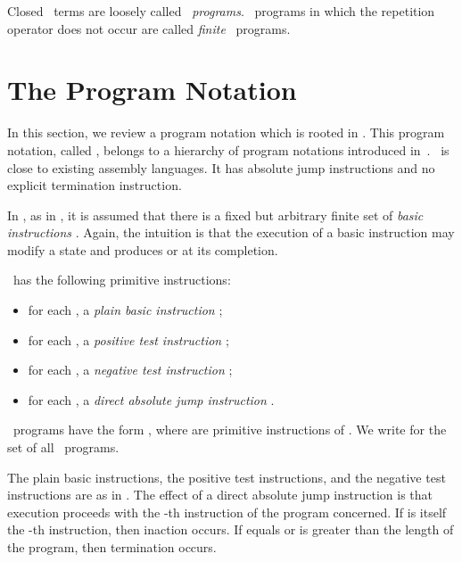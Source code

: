 \documentclass[fleqn]{llncs}
\begin{document}
Closed \PGA\ terms are loosely called \PGA\ \emph{programs}.
\PGA\ programs in which the repetition operator does not occur are
called \emph{finite} \PGA\ programs.

\section{The Program Notation \PGLD}
\label{sect-PGLD}

In this section, we review a program notation which is rooted in \PGA.
This program notation, called \PGLD, belongs to a hierarchy of program
notations introduced in~\cite{BL02a}.
\PGLD\ is close to existing assembly languages.
It has absolute jump instructions and no explicit termination
instruction.

In \PGLD, as in \PGA, it is assumed that there is a fixed but arbitrary
finite set of \emph{basic instructions} .
Again, the intuition is that the execution of a basic instruction 
may modify a state and produces  or  at its completion.

\PGLD\ has the following primitive instructions:
\begin{itemize}
\item
for each , a \emph{plain basic instruction} ;
\item
for each , a \emph{positive test instruction} ;
\item
for each , a \emph{negative test instruction} ;
\item
for each , a \emph{direct absolute jump instruction}
.
\end{itemize}
\PGLD\ programs have the form , where 
are primitive instructions of \PGLD.
We write  for the set of all \PGLD\ programs.

The plain basic instructions, the positive test instructions, and the
negative test instructions are as in \PGA.
The effect of a direct absolute jump instruction  is that
execution proceeds with the -th instruction of the program concerned.
If  is itself the -th instruction, then inaction occurs.
If  equals  or  is greater than the length of the program, then
termination occurs.
\end{document}

